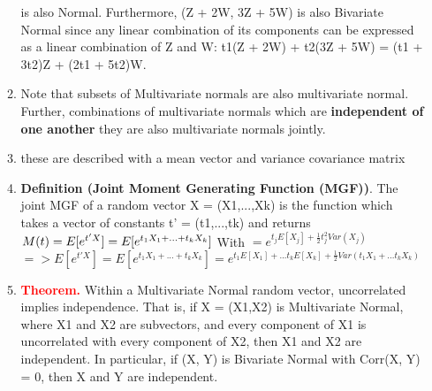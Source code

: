 \documentclass[11pt]{article}
\begin{document}
\begin{enumerate}
\begin{enumerate}
	is also Normal. Furthermore, (Z + 2W, 3Z + 5W) is also Bivariate Normal since any linear combination of its	components can be expressed as a linear combination of Z and W:
	t1(Z + 2W) + t2(3Z + 5W) = (t1 + 3t2)Z + (2t1 + 5t2)W.
	\item Note that subsets of Multivariate normals are also multivariate normal. Further, combinations of multivariate normals which are \textbf{independent of one another} they are also multivariate normals jointly.
	\item these are described with a mean vector and variance covariance matrix
	\item\textbf{ Definition (Joint Moment Generating Function (MGF))}. The joint MGF of a random vector X = (X1,...,Xk)
	is the function which takes a vector of constants t' = (t1,...,tk) and returns	\\
	$M(t) = E[e^{t'X}] = E[e^{t_1X_1+...+t_kX_k}]\\
	$ With $ = e^{t_jE[X_j] + \frac{1}{2} t_j^2Var(X_j)}$\\
	$=> E[e^{t'X}] = E[e^{t_1X_1+...+t_kX_k}] = e^{t_1E[X_1] + ... t_kE[X_k] + \frac{1}{2} Var(t_1X_1+...t_kX_k)} $
	\item \textcolor{red}{\textbf{Theorem.}} Within a Multivariate Normal random vector, uncorrelated implies independence. That is, if
	X = (X1,X2) is Multivariate Normal, where X1 and X2 are subvectors, and every component of X1 is uncorrelated with every component of X2, then X1 and X2 are independent. In particular, if (X, Y) is	Bivariate Normal with Corr(X, Y) = 0, then X and Y are independent.
	

\end{enumerate}
\end{enumerate}
\end{document}
